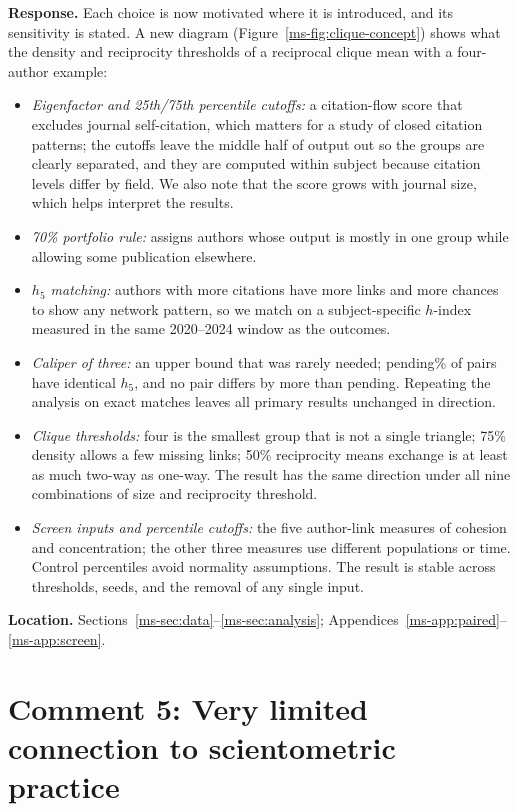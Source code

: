 \documentclass[11pt]{article}
\providecommand{\ExactHFivePairPercent}{pending}
\providecommand{\MaximumAbsoluteHFiveDifference}{pending}
\newcommand{\response}{\textbf{Response.} }
\newcommand{\location}[1]{\textbf{Location.} #1.}
\begin{document}
\response Each choice is now motivated where it is introduced, and its sensitivity is stated.  A new diagram (Figure~\ref{ms-fig:clique-concept}) shows what the density and reciprocity thresholds of a reciprocal clique mean with a four-author example:
\begin{itemize}
  \item \emph{Eigenfactor and 25th/75th percentile cutoffs:} a citation-flow score that excludes journal self-citation, which matters for a study of closed citation patterns; the cutoffs leave the middle half of output out so the groups are clearly separated, and they are computed within subject because citation levels differ by field.  We also note that the score grows with journal size, which helps interpret the results.
  \item \emph{70\% portfolio rule:} assigns authors whose output is mostly in one group while allowing some publication elsewhere.
  \item \emph{$h_5$ matching:} authors with more citations have more links and more chances to show any network pattern, so we match on a subject-specific $h$-index measured in the same 2020--2024 window as the outcomes.
  \item \emph{Caliper of three:} an upper bound that was rarely needed; \ExactHFivePairPercent\% of pairs have identical $h_5$, and no pair differs by more than \MaximumAbsoluteHFiveDifference.  Repeating the analysis on exact matches leaves all primary results unchanged in direction.
  \item \emph{Clique thresholds:} four is the smallest group that is not a single triangle; 75\% density allows a few missing links; 50\% reciprocity means exchange is at least as much two-way as one-way.  The result has the same direction under all nine combinations of size and reciprocity threshold.
  \item \emph{Screen inputs and percentile cutoffs:} the five author-link measures of cohesion and concentration; the other three measures use different populations or time.  Control percentiles avoid normality assumptions.  The result is stable across thresholds, seeds, and the removal of any single input.
\end{itemize}

\location{Sections~\ref{ms-sec:data}--\ref{ms-sec:analysis}; Appendices~\ref{ms-app:paired}--\ref{ms-app:screen}}

\section*{Comment 5: Very limited connection to scientometric practice}
\end{document}

